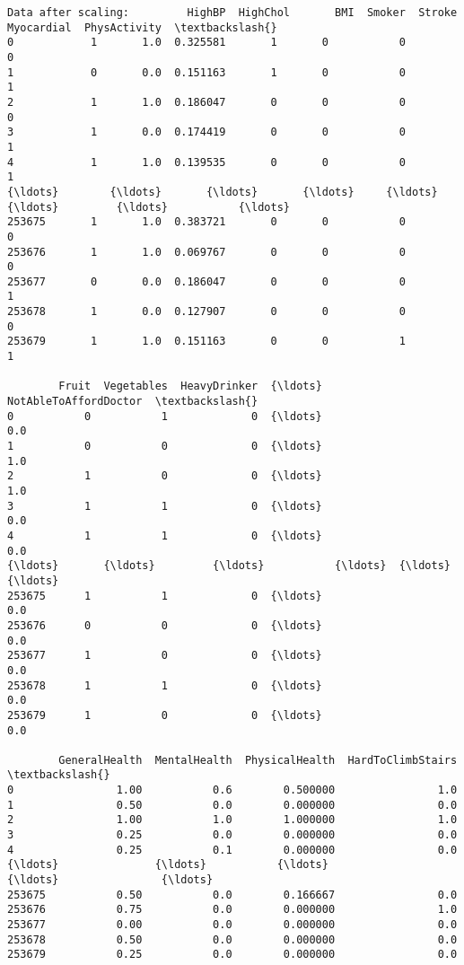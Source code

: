 \documentclass[11pt]{article}
\begin{document}
    \begin{Verbatim}[commandchars=\\\{\}]
Data after scaling:         HighBP  HighChol       BMI  Smoker  Stroke
Myocardial  PhysActivity  \textbackslash{}
0            1       1.0  0.325581       1       0           0             0
1            0       0.0  0.151163       1       0           0             1
2            1       1.0  0.186047       0       0           0             0
3            1       0.0  0.174419       0       0           0             1
4            1       1.0  0.139535       0       0           0             1
{\ldots}        {\ldots}       {\ldots}       {\ldots}     {\ldots}     {\ldots}         {\ldots}           {\ldots}
253675       1       1.0  0.383721       0       0           0             0
253676       1       1.0  0.069767       0       0           0             0
253677       0       0.0  0.186047       0       0           0             1
253678       1       0.0  0.127907       0       0           0             0
253679       1       1.0  0.151163       0       0           1             1

        Fruit  Vegetables  HeavyDrinker  {\ldots}  NotAbleToAffordDoctor  \textbackslash{}
0           0           1             0  {\ldots}                    0.0
1           0           0             0  {\ldots}                    1.0
2           1           0             0  {\ldots}                    1.0
3           1           1             0  {\ldots}                    0.0
4           1           1             0  {\ldots}                    0.0
{\ldots}       {\ldots}         {\ldots}           {\ldots}  {\ldots}                    {\ldots}
253675      1           1             0  {\ldots}                    0.0
253676      0           0             0  {\ldots}                    0.0
253677      1           0             0  {\ldots}                    0.0
253678      1           1             0  {\ldots}                    0.0
253679      1           0             0  {\ldots}                    0.0

        GeneralHealth  MentalHealth  PhysicalHealth  HardToClimbStairs  \textbackslash{}
0                1.00           0.6        0.500000                1.0
1                0.50           0.0        0.000000                0.0
2                1.00           1.0        1.000000                1.0
3                0.25           0.0        0.000000                0.0
4                0.25           0.1        0.000000                0.0
{\ldots}               {\ldots}           {\ldots}             {\ldots}                {\ldots}
253675           0.50           0.0        0.166667                0.0
253676           0.75           0.0        0.000000                1.0
253677           0.00           0.0        0.000000                0.0
253678           0.50           0.0        0.000000                0.0
253679           0.25           0.0        0.000000                0.0


\end{Verbatim}
\end{document}
